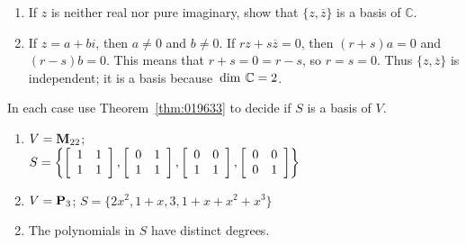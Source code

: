 \begin{multicols}{2}
\begin{ex}
\begin{enumerate}[label={\alph*.}]
\item If $z$ is neither real nor pure imaginary, show that $\{z, \overline{z} \}$ is a basis of $\mathbb{C}$.

\end{enumerate}
\begin{sol}
\begin{enumerate}[label={\alph*.}]
\setcounter{enumi}{1}
\item  If $z = a + bi$, then $a \neq 0$ and $b \neq 0$. If $rz + s\overline{z} = 0$,  then $(r + s)a = 0$ and $(r - s)b = 0$. This means that $r + s = 0 = r - s$, so $r = s = 0$. Thus $\{z, \overline{z} \}$ is independent; it is a basis because $\thinspace\operatorname{dim\medspace} \mathbb{C} = 2$.

\end{enumerate}
\end{sol}
\end{ex}

\begin{ex}
In each case use Theorem~\ref{thm:019633} to decide if $S$ is a basis of $V$.

\begin{enumerate}[label={\alph*.}]
\item $V = \textbf{M}_{22}$; \\
\hspace*{-2em}$S =
\left\{
\left[ \begin{array}{rr}
	1 & 1 \\
	1 & 1  
\end{array} \right]
, 
\left[ \begin{array}{rr}
	0 & 1 \\
	1 & 1
\end{array} \right]
, 
\left[ \begin{array}{rr}
	0 & 0 \\
	1 & 1
\end{array} \right]
, 
\left[ \begin{array}{rr}
	0 & 0 \\
	0 & 1
\end{array} \right]
\right\}$

\item $V = \textbf{P}_{3}$; $S = \{2x^{2}, 1 + x, 3, 1 + x + x^{2} + x^{3}\}$

\end{enumerate}
\begin{sol}
\begin{enumerate}[label={\alph*.}]
\setcounter{enumi}{1}
\item  The polynomials in $S$ have distinct degrees.


\end{enumerate}
\end{sol}
\end{ex}
\end{multicols}
